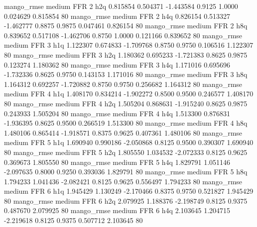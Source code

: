        mango_rmse     medium      FFR                 2                  h2q  0.815854 0.504371 -1.443584 0.9125 1.0000  0.024629    0.815854 80
       mango_rmse     medium      FFR                 2                  h4q  0.826154 0.513327 -1.462777 0.8875 0.9875  0.047461    0.826154 80
       mango_rmse     medium      FFR                 2                  h8q  0.839652 0.517108 -1.462706 0.8750 1.0000  0.121166    0.839652 80
       mango_rmse     medium      FFR                 3                  h1q  1.122307 0.674833 -1.709768 0.8750 0.9750  0.106516    1.122307 80
       mango_rmse     medium      FFR                 3                  h2q  1.180362 0.695233 -1.721383 0.8625 0.9875  0.123274    1.180362 80
       mango_rmse     medium      FFR                 3                  h4q  1.171016 0.695696 -1.732336 0.8625 0.9750  0.143153    1.171016 80
       mango_rmse     medium      FFR                 3                  h8q  1.164312 0.692257 -1.720882 0.8750 0.9750  0.256682    1.164312 80
       mango_rmse     medium      FFR                 4                  h1q  1.408170 0.834214 -1.902272 0.8500 0.9500  0.246577    1.408170 80
       mango_rmse     medium      FFR                 4                  h2q  1.505204 0.868631 -1.915240 0.8625 0.9875  0.243933    1.505204 80
       mango_rmse     medium      FFR                 4                  h4q  1.513300 0.876831 -1.936395 0.8625 0.9500  0.266519    1.513300 80
       mango_rmse     medium      FFR                 4                  h8q  1.480106 0.865414 -1.918571 0.8375 0.9625  0.407361    1.480106 80
       mango_rmse     medium      FFR                 5                  h1q  1.690940 0.990186 -2.050868 0.8125 0.9500  0.390307    1.690940 80
       mango_rmse     medium      FFR                 5                  h2q  1.805550 1.034532 -2.072333 0.8125 0.9625  0.369673    1.805550 80
       mango_rmse     medium      FFR                 5                  h4q  1.829791 1.051146 -2.097635 0.8000 0.9250  0.393036    1.829791 80
       mango_rmse     medium      FFR                 5                  h8q  1.794233 1.041436 -2.082421 0.8125 0.9625  0.556497    1.794233 80
       mango_rmse     medium      FFR                 6                  h1q  1.945429 1.130249 -2.170466 0.8375 0.9750  0.521827    1.945429 80
       mango_rmse     medium      FFR                 6                  h2q  2.079925 1.188376 -2.198749 0.8125 0.9375  0.487670    2.079925 80
       mango_rmse     medium      FFR                 6                  h4q  2.103645 1.204715 -2.219618 0.8125 0.9375  0.507712    2.103645 80
